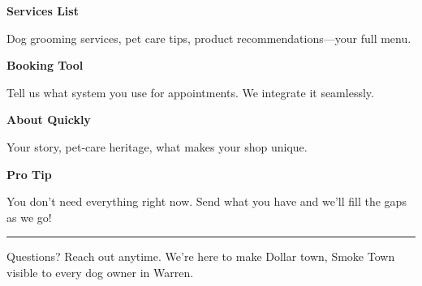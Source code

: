 \documentclass[11pt,letterpaper]{article}
\begin{document}
\begin{minipage}[t]{0.48\textwidth}
\begin{tcolorbox}[colframe=accent-teal, boxrule=1pt, left=0.7em, right=0.7em, top=0.5em, bottom=0.5em, arc=4pt, boxsep=0pt]
{\bfseries\small\color{accent-teal}Services List}

\vspace{0.15em}

{\small Dog grooming services, pet care tips, product recommendations—your full menu.}
\end{tcolorbox}

\vspace{0.1em}

\begin{tcolorbox}[colframe=accent-teal, boxrule=1pt, left=0.7em, right=0.7em, top=0.5em, bottom=0.5em, arc=4pt, boxsep=0pt]
{\bfseries\small\color{accent-teal}Booking Tool}

\vspace{0.15em}

{\small Tell us what system you use for appointments. We integrate it seamlessly.}
\end{tcolorbox}

\vspace{0.1em}

\begin{tcolorbox}[colframe=accent-teal, boxrule=1pt, left=0.7em, right=0.7em, top=0.5em, bottom=0.5em, arc=4pt, boxsep=0pt]
{\bfseries\small\color{accent-teal}About Quickly}

\vspace{0.15em}

{\small Your story, pet‑care heritage, what makes your shop unique.}
\end{tcolorbox}

\vspace{-0.2em}
\end{minipage}

\vspace{0.15em}

\begin{tcolorbox}[colback={accent-red!5}, colframe=accent-red!20, boxrule=0.5pt, left=0.7em, right=0.7em, top=0.4em, bottom=0.4em, arc=6pt, boxsep=0pt]

{\bfseries\small\color{accent-red}Pro Tip}

\vspace{0.1em}

{\small You don't need everything right now. Send what you have and we'll fill the gaps as we go!}

\end{tcolorbox}

\vspace{0.15em}

\noindent\hrule
\vspace{0.2em}

{\small\color{text-light}Questions? Reach out anytime. We're here to make Dollar town, Smoke Town visible to every dog owner in Warren.}
\end{document}
